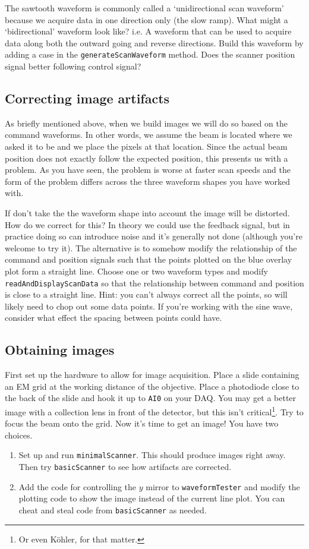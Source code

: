 \documentclass[a4paper]{report}
\begin{document}
The sawtooth waveform is commonly called a `unidirectional scan waveform' because we acquire data in one direction only (the slow ramp). 
What might a `bidirectional' waveform look like? i.e. A waveform that can be used to acquire data along both the outward going and reverse directions. 
Build this waveform by adding a case in the \texttt{generateScanWaveform} method. 
Does the scanner position signal better following control signal?




\subsection{Correcting image artifacts}
As briefly mentioned above, when we build images we will do so based on the command waveforms. 
In other words, we assume the beam is located where we asked it to be and we place the pixels at that location.
Since the actual beam position does not exactly follow the expected position, this presents us with a problem. 
As you have seen, the problem is worse at faster scan speeds and the form of the problem differs across the three waveform shapes you have worked with.

If don't take the the waveform shape into account the image will be distorted. 
How do we correct for this?
In theory we could use the feedback signal, but in practice doing so can introduce noise and it's generally not done (although you're welcome to try it). 
The alternative is to somehow modify the relationship of the command and position signals such that the points plotted on the blue overlay plot form a straight line.
Choose one or two waveform types and modify \texttt{readAndDisplayScanData} so that the relationship between command and position is close to a straight line. 
Hint: you can't always correct all the points, so will likely need to chop out some data points. 
If you're working with the sine wave, consider what effect the spacing between points could have.



\subsection{Obtaining images}
First set up the hardware to allow for image acquisition.
Place a slide containing an EM grid at the working distance of the objective. 
Place a photodiode close to the back of the slide and hook it up to \texttt{AI0} on your DAQ. 
You may get a better image with a collection lens in front of the detector, but this isn't critical\footnote{Or even K\"{o}hler, for that matter.}.
Try to focus the beam onto the grid.
Now it's time to get an image!
You have two choices.
\begin{enumerate}
    \item Set up and run \texttt{minimalScanner}. This should produce images right away. Then try \texttt{basicScanner} to see how artifacts are corrected.
    \item Add the code for controlling the $y$ mirror to \texttt{waveformTester} and modify the plotting code to show the image instead of the current line plot. 
    You can cheat and steal code from \texttt{basicScanner} as needed. 
\end{enumerate}
\end{document}
